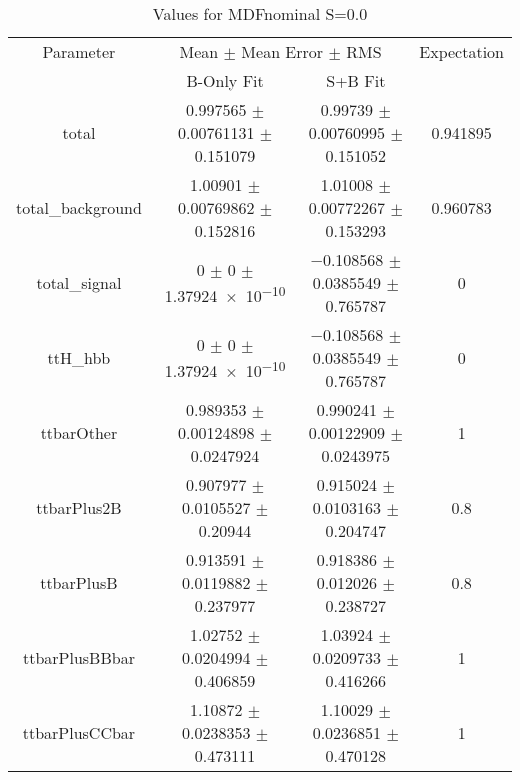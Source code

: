 \begin{table}
\centering
\caption{Values for MDFnominal S=0.0}
\begin{tabular}{cccc}
\toprule
Parameter & \multicolumn{2}{c}{Mean $\pm$ Mean Error $\pm$ RMS} & Expectation\\
 & B-Only Fit & S+B Fit & \\
\midrule
total & \num{0.997565} $\pm$ \num{0.00761131} $\pm$ \num{0.151079} & \num{0.99739} $\pm$ \num{0.00760995} $\pm$ \num{0.151052} & \num{0.941895}\\
total\_background & \num{1.00901} $\pm$ \num{0.00769862} $\pm$ \num{0.152816} & \num{1.01008} $\pm$ \num{0.00772267} $\pm$ \num{0.153293} & \num{0.960783}\\
total\_signal & \num{0} $\pm$ \num{0} $\pm$ \num{1.37924e-10} & \num{-0.108568} $\pm$ \num{0.0385549} $\pm$ \num{0.765787} & \num{0}\\
ttH\_hbb & \num{0} $\pm$ \num{0} $\pm$ \num{1.37924e-10} & \num{-0.108568} $\pm$ \num{0.0385549} $\pm$ \num{0.765787} & \num{0}\\
ttbarOther & \num{0.989353} $\pm$ \num{0.00124898} $\pm$ \num{0.0247924} & \num{0.990241} $\pm$ \num{0.00122909} $\pm$ \num{0.0243975} & \num{1}\\
ttbarPlus2B & \num{0.907977} $\pm$ \num{0.0105527} $\pm$ \num{0.20944} & \num{0.915024} $\pm$ \num{0.0103163} $\pm$ \num{0.204747} & \num{0.8}\\
ttbarPlusB & \num{0.913591} $\pm$ \num{0.0119882} $\pm$ \num{0.237977} & \num{0.918386} $\pm$ \num{0.012026} $\pm$ \num{0.238727} & \num{0.8}\\
ttbarPlusBBbar & \num{1.02752} $\pm$ \num{0.0204994} $\pm$ \num{0.406859} & \num{1.03924} $\pm$ \num{0.0209733} $\pm$ \num{0.416266} & \num{1}\\
ttbarPlusCCbar & \num{1.10872} $\pm$ \num{0.0238353} $\pm$ \num{0.473111} & \num{1.10029} $\pm$ \num{0.0236851} $\pm$ \num{0.470128} & \num{1}\\
\bottomrule
\end{tabular}
\end{table}